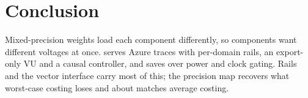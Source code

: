 \section{Conclusion}
Mixed-precision weights load each component differently, so components want different voltages at once. \sys{} serves Azure traces with per-domain rails, an export-only VU and a causal controller, and saves  over power and clock gating. Rails and the vector interface carry most of this; the precision map recovers what worst-case costing loses and about matches average costing.
